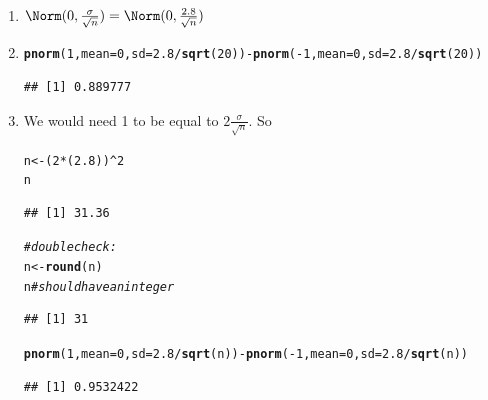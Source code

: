 \documentclass[twoside]{book}\usepackage[]{graphicx}\usepackage[]{xcolor}
\makeatletter
\newcommand{\hlnum}[1]{\textcolor[rgb]{0.686,0.059,0.569}{#1}}%
\newcommand{\hlcom}[1]{\textcolor[rgb]{0.678,0.584,0.686}{\textit{#1}}}%
\newcommand{\hlopt}[1]{\textcolor[rgb]{0,0,0}{#1}}%
\newcommand{\hlstd}[1]{\textcolor[rgb]{0.345,0.345,0.345}{#1}}%
\newcommand{\hlkwb}[1]{\textcolor[rgb]{0.69,0.353,0.396}{#1}}%
\newcommand{\hlkwc}[1]{\textcolor[rgb]{0.333,0.667,0.333}{#1}}%
\newcommand{\hlkwd}[1]{\textcolor[rgb]{0.737,0.353,0.396}{\textbf{#1}}}%
\newenvironment{kframe}{%
 \def\at@end@of@kframe{}%
 \ifinner\ifhmode%
  \def\at@end@of@kframe{\end{minipage}}%
  \begin{minipage}{\columnwidth}%
 \fi\fi%
 \def\FrameCommand##1{\hskip\@totalleftmargin \hskip-\fboxsep
 \colorbox{shadecolor}{##1}\hskip-\fboxsep
     \hskip-\linewidth \hskip-\@totalleftmargin \hskip\columnwidth}%
 \MakeFramed {\advance\hsize-\width
   \@totalleftmargin\z@ \linewidth\hsize
   \@setminipage}}%
 {\par\unskip\endMakeFramed%
 \at@end@of@kframe}
\newenvironment{knitrout}{}{} %
\makeatother
\begin{document}
\begin{solution}
	\begin{enumerate}
		\item
			$\Norm( 0, \frac{\sigma}{\sqrt{n}}) = 
			 \Norm( 0, \frac{2.8}{\sqrt{n}}) $ 
		 \item
\begin{knitrout}
\color{fgcolor}\begin{kframe}
\begin{alltt}
\hlkwd{pnorm}\hlstd{(}\hlnum{1}\hlstd{,} \hlkwc{mean} \hlstd{=} \hlnum{0}\hlstd{,} \hlkwc{sd} \hlstd{=} \hlnum{2.8}\hlopt{/}\hlkwd{sqrt}\hlstd{(}\hlnum{20}\hlstd{))} \hlopt{-} \hlkwd{pnorm}\hlstd{(}\hlopt{-}\hlnum{1}\hlstd{,} \hlkwc{mean} \hlstd{=} \hlnum{0}\hlstd{,} \hlkwc{sd} \hlstd{=} \hlnum{2.8}\hlopt{/}\hlkwd{sqrt}\hlstd{(}\hlnum{20}\hlstd{))}
\end{alltt}
\begin{verbatim}
## [1] 0.889777
\end{verbatim}
\end{kframe}
\end{knitrout}
		 \item
			 We would need 1 to be equal to $2 \frac{\sigma}{\sqrt n}$. So
\begin{knitrout}
\color{fgcolor}\begin{kframe}
\begin{alltt}
\hlstd{n} \hlkwb{<-} \hlstd{(}\hlnum{2} \hlopt{*} \hlstd{(}\hlnum{2.8}\hlstd{))}\hlopt{^}\hlnum{2}
\hlstd{n}
\end{alltt}
\begin{verbatim}
## [1] 31.36
\end{verbatim}
\begin{alltt}
\hlcom{# double check:}
\hlstd{n} \hlkwb{<-} \hlkwd{round}\hlstd{(n)}
\hlstd{n}  \hlcom{# should have an integer}
\end{alltt}
\begin{verbatim}
## [1] 31
\end{verbatim}
\begin{alltt}
\hlkwd{pnorm}\hlstd{(}\hlnum{1}\hlstd{,} \hlkwc{mean} \hlstd{=} \hlnum{0}\hlstd{,} \hlkwc{sd} \hlstd{=} \hlnum{2.8}\hlopt{/}\hlkwd{sqrt}\hlstd{(n))} \hlopt{-} \hlkwd{pnorm}\hlstd{(}\hlopt{-}\hlnum{1}\hlstd{,} \hlkwc{mean} \hlstd{=} \hlnum{0}\hlstd{,} \hlkwc{sd} \hlstd{=} \hlnum{2.8}\hlopt{/}\hlkwd{sqrt}\hlstd{(n))}
\end{alltt}
\begin{verbatim}
## [1] 0.9532422
\end{verbatim}
\end{kframe}
\end{knitrout}


\end{enumerate}
\end{solution}
\end{document}
